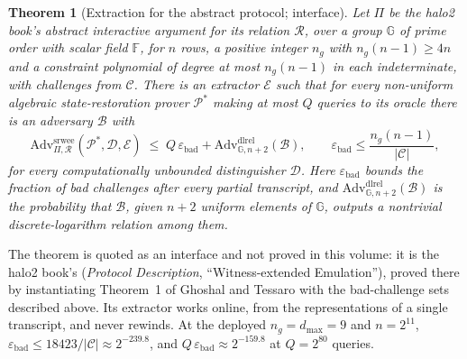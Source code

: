 \documentclass[11pt,a4paper]{article}
\newtheorem{theorem}{Theorem}[section]
\theoremstyle{definition}
\newcommand{\F}{\mathbb{F}}
\newcommand{\G}{\mathbb{G}}
\newcommand{\Prov}{\mathcal{P}}
\newcommand{\Ext}{\mathcal{E}}
\newcommand{\Rel}{\mathcal{R}}
\begin{document}
\begin{theorem}[Extraction for the abstract protocol; interface]
\label{thm:ks-srwee}
Let $\Pi$ be the halo2 book's abstract interactive argument for its
relation $\Rel$, over a group $\G$ of prime order with scalar field
$\F$, for $n$ rows, a positive integer $n_g$ with $n_g(n - 1) \ge 4n$
and a constraint polynomial of degree at most $n_g(n - 1)$ in each
indeterminate, with challenges from $\mathcal C$.
There is an extractor
$\Ext$ such that for every non-uniform algebraic state-restoration
prover $\Prov^{*}$ making at most $Q$ queries to its oracle there is an
adversary $\mathcal B$ with
\[
\mathrm{Adv}^{\mathrm{srwee}}_{\Pi, \Rel}(\Prov^{*}, \mathcal D, \Ext)
\;\le\; Q\,\varepsilon_{\mathrm{bad}}
  + \mathrm{Adv}^{\mathrm{dlrel}}_{\G, n+2}(\mathcal B),
\qquad
\varepsilon_{\mathrm{bad}} \le \frac{n_g(n - 1)}{|\mathcal C|},
\]
for every computationally unbounded distinguisher $\mathcal D$. Here
$\varepsilon_{\mathrm{bad}}$ bounds the fraction of bad challenges after
every partial transcript, and
$\mathrm{Adv}^{\mathrm{dlrel}}_{\G, n+2}(\mathcal B)$ is the probability
that $\mathcal B$, given $n + 2$ uniform elements of $\G$, outputs a
nontrivial discrete-logarithm relation among them.
\end{theorem}

The theorem is quoted as an interface and not proved in this volume: it
is the halo2 book's (\emph{Protocol Description}, ``Witness-extended
Emulation''), proved there by instantiating Theorem~1 of Ghoshal and
Tessaro with the bad-challenge sets described above. Its
extractor works online, from the representations of a single
transcript, and never rewinds. At the deployed $n_g = d_{\max} = 9$ and
$n = 2^{11}$, $\varepsilon_{\mathrm{bad}} \le 18423/|\mathcal C| \approx
2^{-239.8}$, and $Q\,\varepsilon_{\mathrm{bad}} \approx 2^{-159.8}$ at
$Q = 2^{80}$ queries.
\end{document}
